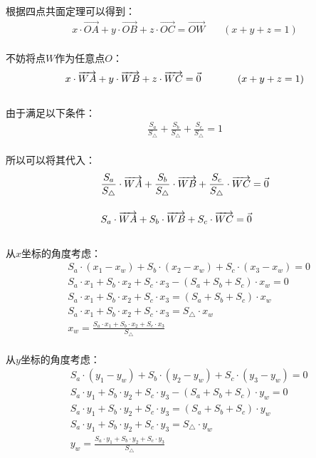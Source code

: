 \documentclass[UTF8]{ctexart}
\let\nvec\vec
\def\vec#1{\nvec{\vphantom b\smash{#1}}}
\begin{document}
\newpage

    根据四点共面定理可以得到：
    \setcounter{equation}{0}
    \begin{align}
        x\cdot\overrightarrow{OA}+y\cdot\overrightarrow{OB}+z\cdot\overrightarrow{OC}=\overrightarrow{OW}~~~~~~~~(x+y+z=1)
    \end{align}\\
    不妨将点$W$作为任意点$O$：
    \begin{align}
        x\cdot\overrightarrow{WA}+y\cdot\overrightarrow{WB}+z\cdot\overrightarrow{WC}=\vec{0}~~~~~~~~~~~(x+y+z=1)
    \end{align}\\
    由于满足以下条件：
    \begin{align}
        \frac{S_a}{S_{\triangle}}+\frac{S_b}{S_{\triangle}}+\frac{S_c}{S_{\triangle}}=1
    \end{align}\\
    所以可以将其代入：
    \begin{align}
        &\frac{S_a}{S_{\triangle}}\cdot\overrightarrow{WA}+\frac{S_b}{S_{\triangle}}\cdot\overrightarrow{WB}+\frac{S_c}{S_{\triangle}}\cdot\overrightarrow{WC}=\vec{0}\\[4mm]
        &S_a\cdot\overrightarrow{WA}+S_b\cdot\overrightarrow{WB}+S_c\cdot\overrightarrow{WC}=\vec{0}
    \end{align}\\
    从$x$坐标的角度考虑：
    \begin{align}
        &S_a\cdot(x_1-x_w)+S_b\cdot(x_2-x_w)+S_c\cdot(x_3-x_w)=0\\[3mm]
        &S_a\cdot x_1+S_b\cdot x_2+S_c\cdot x_3-(S_a+S_b+S_c)\cdot x_w=0\\[3mm]
        &S_a\cdot x_1+S_b\cdot x_2+S_c\cdot x_3=(S_a+S_b+S_c)\cdot x_w\\[3mm]
        &S_a\cdot x_1+S_b\cdot x_2+S_c\cdot x_3=S_{\triangle}\cdot x_w\\[3mm]
        &x_w=\frac{S_a\cdot x_1+S_b\cdot x_2+S_c\cdot x_3}{S_{\triangle}}
    \end{align}\\
    从$y$坐标的角度考虑：
    \begin{align}
        &S_a\cdot(y_1-y_w)+S_b\cdot(y_2-y_w)+S_c\cdot(y_3-y_w)=0\\[3mm]
        &S_a\cdot y_1+S_b\cdot y_2+S_c\cdot y_3-(S_a+S_b+S_c)\cdot y_w=0\\[3mm]
        &S_a\cdot y_1+S_b\cdot y_2+S_c\cdot y_3=(S_a+S_b+S_c)\cdot y_w\\[3mm]
        &S_a\cdot y_1+S_b\cdot y_2+S_c\cdot y_3=S_{\triangle}\cdot y_w\\[3mm]
        &y_w=\frac{S_a\cdot y_1+S_b\cdot y_2+S_c\cdot y_3}{S_{\triangle}}
    \end{align}
\end{document}

